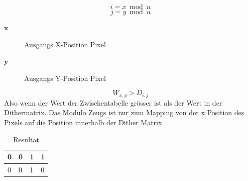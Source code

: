 \begin{displaymath}
	i = x \bmod n
\end{displaymath}
\begin{displaymath}
	j = y \bmod n
\end{displaymath}

\begin{description}
	\item[\(\mathbf{x}\)] Ausgangs X-Position Pixel 
	\item[\(\mathbf{y}\)] Ausgangs Y-Position Pixel
\end{description}

\begin{displaymath}
W_{x,y} > D_{i,j}
\end{displaymath}
Also wenn der Wert der Zwischentabelle grösser ist als der Wert in der Dithermatrix. Das Modulo Zeugs ist nur zum Mapping von der x Position des Pixels auf die Position innerhalb der Dither Matrix.

\begin{table}[!ht]
	\centering
	\caption{Resultat}
	\label{tbl:resultat_dither}
	\begin{tabular}{|l|l|l|l|}
		\hline
		0 & 0 & 1 & 1 \\ \hline
		0  & 0  & 1 & 0 \\ 
		\hline
	\end{tabular}
\end{table}


